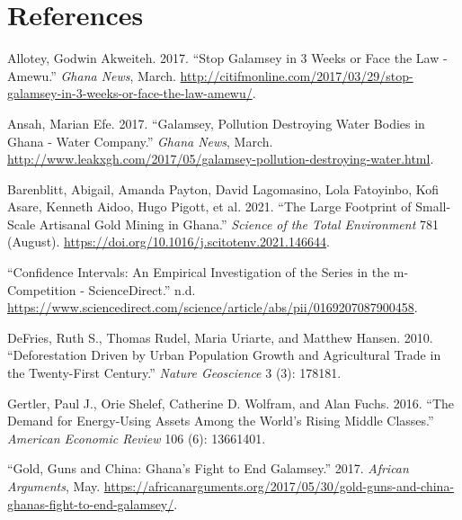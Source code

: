 \documentclass[
  onepage,
  openany]{scrbook}
\newlength{\cslhangindent}
\newlength{\cslentryspacingunit} %
\newenvironment{CSLReferences}[2] %
 {%
  \setlength{\parindent}{0pt}
  \ifodd #1
  \let\oldpar\par
  \def\par{\hangindent=\cslhangindent\oldpar}
  \fi
  \setlength{\parskip}{#2\cslentryspacingunit}
 }%
 {}
\begin{document}
\hypertarget{references}{%
\chapter*{References}\label{references}}

\hypertarget{refs}{}
\begin{CSLReferences}{1}{0}
\leavevmode{}%
Allotey, Godwin Akweiteh. 2017. {``Stop Galamsey in 3 Weeks or Face the
Law - Amewu.''} \emph{Ghana News}, March.
\url{http://citifmonline.com/2017/03/29/stop-galamsey-in-3-weeks-or-face-the-law-amewu/}.

\leavevmode{}%
Ansah, Marian Efe. 2017. {``Galamsey, Pollution Destroying Water Bodies
in Ghana - Water Company.''} \emph{Ghana News}, March.
\url{http://www.leakxgh.com/2017/05/galamsey-pollution-destroying-water.html}.

\leavevmode{}%
Barenblitt, Abigail, Amanda Payton, David Lagomasino, Lola Fatoyinbo,
Kofi Asare, Kenneth Aidoo, Hugo Pigott, et al. 2021. {``The Large
Footprint of Small-Scale Artisanal Gold Mining in Ghana.''}
\emph{Science of the Total Environment} 781 (August).
\url{https://doi.org/10.1016/j.scitotenv.2021.146644}.

\leavevmode{}%
{``Confidence Intervals: An Empirical Investigation of the Series in the
m-Competition - ScienceDirect.''} n.d.
\url{https://www.sciencedirect.com/science/article/abs/pii/0169207087900458}.

\leavevmode{}%
DeFries, Ruth S., Thomas Rudel, Maria Uriarte, and Matthew Hansen. 2010.
{``Deforestation Driven by Urban Population Growth and Agricultural
Trade in the Twenty-First Century.''} \emph{Nature Geoscience} 3 (3):
178181.

\leavevmode{}%
Gertler, Paul J., Orie Shelef, Catherine D. Wolfram, and Alan Fuchs.
2016. {``The Demand for Energy-Using Assets Among the World's Rising
Middle Classes.''} \emph{American Economic Review} 106 (6): 13661401.

\leavevmode{}%
{``Gold, Guns and China: Ghana's Fight to End Galamsey.''} 2017.
\emph{African Arguments}, May.
\url{https://africanarguments.org/2017/05/30/gold-guns-and-china-ghanas-fight-to-end-galamsey/}.


\end{CSLReferences}
\end{document}
